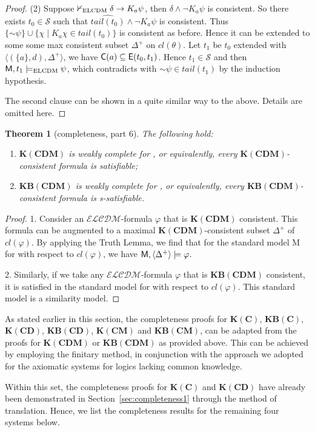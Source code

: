\documentclass{article}
\newtheorem{theorem}{Theorem}
\newcommand{\CC}{\textnormal{\sf C}\xspace}
\newcommand{\CE}{\textnormal{\sf E}\xspace}
\newcommand{\CM}{\textnormal{\sf M}\xspace}
\newcommand{\NEG}{\ensuremath{\mathord\sim}}
\renewcommand{\phi}{\varphi}
\newcommand{\ra}{\rightarrow}
\newcommand{\mcS}{\mathcal{S}}
\newcommand{\langcdm}{\ensuremath{\mathcal{ELCDM}}\xspace}
\newcommand{\lcdm}{\text{\normalfont ELCDM}\xspace}
\newcommand{\lscdm}{\text{\normalfont ELCDM$^s$}\xspace}
\newcommand{\KC}{\ensuremath{\mathbf{K(C)}}\xspace}
\newcommand{\KCD}{\ensuremath{\mathbf{K(CD)}}\xspace}
\newcommand{\KCDM}{\ensuremath{\mathbf{K(CDM)}}\xspace}
\newcommand{\KCM}{\ensuremath{\mathbf{K(CM)}}\xspace}
\newcommand{\KBC}{\ensuremath{\mathbf{KB(C)}}\xspace}
\newcommand{\KBCD}{\ensuremath{\mathbf{KB(CD)}}\xspace}
\newcommand{\KBCDM}{\ensuremath{\mathbf{KB(CDM)}}\xspace}
\newcommand{\KBCM}{\ensuremath{\mathbf{KB(CM)}}\xspace}
\begin{document}
\begin{proof}
(2) Suppose $\nvdash_{\lcdm}\delta\ra K_a\psi$, then $\delta\wedge \neg K_a\psi$ is consistent. So there exists $t_0\in\mcS$ such that $\widehat{tail(t_0)}\wedge\neg K_a\psi$ is consistent. Thus $\{\NEG\psi\}\cup\{\chi\mid K_a\chi\in tail(t_0)\}$ is consistent as before. Hence it can be extended to some some max consistent subset $\Delta^+$ on $cl(\theta)$. Let $t_1$ be $t_0$ extended with $\langle(\{a\},d),\Delta^+\rangle$, we have $\CC(a)\subseteq\CE(t_0,t_1)$. Hence $t_1\in\mcS$ and then $\CM,t_1\models_\lcdm\psi$, which contradicts with $\NEG\psi\in tail(t_1)$ by the induction hypothesis.

The second clause can be shown in a quite similar way to the above. Details are omitted here.
\end{proof}

\begin{theorem}[completeness, part 6]\label{thm:completeness6}
The following hold:
\begin{enumerate}
\item \KCDM is weakly complete for \lcdm, or equivalently, every \KCDM-consistent formula is satisfiable;
\item \KBCDM is weakly complete for \lscdm, or equivalently, every \KBCDM-consistent formula is s-satisfiable.
\end{enumerate}
\end{theorem}
\begin{proof}
1. Consider an \langcdm-formula $\phi$ that is \KCDM consistent. This formula can be augmented to a maximal \KCDM-consistent subset $\Delta^+$ of $cl(\phi)$. By applying the Truth Lemma, we find that for the standard model \CM for \lcdm with respect to $cl(\phi)$, we have $\CM, \langle \Delta^+ \rangle \models \phi$.

2. Similarly, if we take any \langcdm-formula $\phi$ that is \KBCDM consistent, it is satisfied in the standard model for \lscdm with respect to $cl(\phi)$. This standard model is a similarity model. 
\end{proof}

As stated earlier in this section, the completeness proofs for \KC, \KBC, \KCD, \KBCD, \KCM and \KBCM, can be adapted from the proofs for \KCDM or \KBCDM as provided above. This can be achieved by employing the finitary method, in conjunction with the approach we adopted for the axiomatic systems for logics lacking common knowledge.

Within this set, the completeness proofs for \KC and \KCD have already been demonstrated in Section~\ref{sec:completeness1} through the method of translation. Hence, we list the completeness results for the remaining four systems below.
\end{document}
